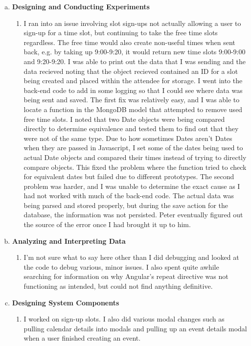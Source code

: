 \documentclass[11pt]{article}   %
\begin{document}
\begin{enumerate} [a)]
\item  {\bf Designing and Conducting Experiments}
\begin{enumerate} [$\cdot$]
\item I ran into an issue involving slot sign-ups not actually allowing a user to sign-up for a time slot, but continuing to take the free time slots regardless. The free time would also create non-useful times when sent back, e.g. by taking up 9:00-9:20, it would return new time slots 9:00-9:00 and 9:20-9:20. I was able to print out the data that I was sending and the data recieved noting that the object recieved contained an ID for a slot being created and placed within the attendee for storage. I went into the back-end code to add in some logging so that I could see where data was being sent and saved. The first fix was relatively easy, and I was able to locate a function in the MongoDB model that attempted to remove used free time slots. I noted that two Date objects were being compared directly to determine equivalence and tested them to find out that they were not of the same type. Due to how sometimes Dates aren't Dates when they are passed in Javascript, I set some of the dates being used to actual Date objects and compared their times instead of trying to directly compare objects. This fixed the problem where the function tried to check for equivalent dates but failed due to different prototypes. The second problem was harder, and I was unable to determine the exact cause as I had not worked with much of the back-end code. The actual data was being parsed and stored properly, but during the save action for the database, the information was not persisted. Peter eventually figured out the source of the error once I had brought it up to him.
\end{enumerate}
\item  {\bf Analyzing and Interpreting Data}
\begin{enumerate} [$\cdot$]
\item  I'm not sure what to say here other than I did debugging and looked at the code to debug various, minor issues. I also spent quite awhile searching for information on why Angular's repeat directive was not functioning as intended, but could not find anything definitive.
\end{enumerate}
\item {\bf Designing System Components}
\begin{enumerate} [$\cdot$]
\item I worked on sign-up slots. I also did various modal changes such as pulling calendar details into modals and pulling up an event details modal when a user finished creating an event.

\end{enumerate}
\end{enumerate}
\end{document}
